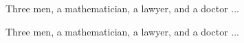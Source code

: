 \begin{joke}
Three men, a mathematician, a lawyer,
and a doctor ...
\end{joke}
\begin{joke}
\rm{Three men, a mathematician, a lawyer,
and a doctor ...}
\end{joke}
